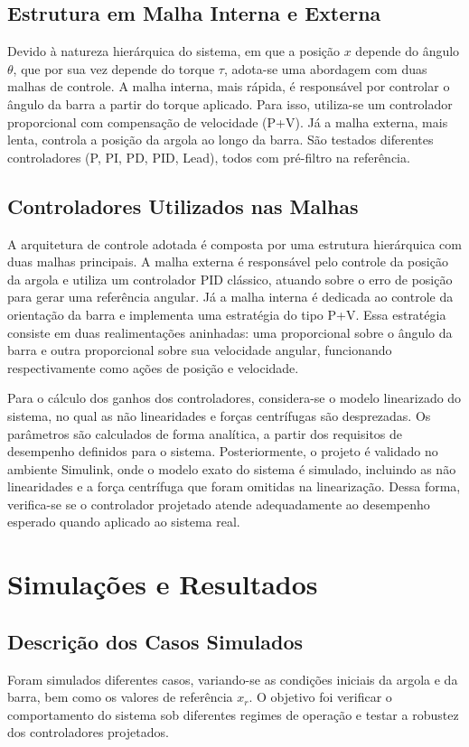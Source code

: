\documentclass[a4paper, 12pt]{article}
\begin{document}
\subsection{Estrutura em Malha Interna e Externa}
Devido à natureza hierárquica do sistema, em que a posição \( x \) depende do ângulo \( \theta \), que por sua vez depende do torque \( \tau \), adota-se uma abordagem com duas malhas de controle. A malha interna, mais rápida, é responsável por controlar o ângulo da barra a partir do torque aplicado. Para isso, utiliza-se um controlador proporcional com compensação de velocidade (P+V). Já a malha externa, mais lenta, controla a posição da argola ao longo da barra. São testados diferentes controladores (P, PI, PD, PID, Lead), todos com pré-filtro na referência.

\subsection{Controladores Utilizados nas Malhas}

A arquitetura de controle adotada é composta por uma estrutura hierárquica com duas malhas principais. A malha externa é responsável pelo controle da posição da argola e utiliza um controlador PID clássico, atuando sobre o erro de posição para gerar uma referência angular. Já a malha interna é dedicada ao controle da orientação da barra e implementa uma estratégia do tipo P+V. Essa estratégia consiste em duas realimentações aninhadas: uma proporcional sobre o ângulo da barra e outra proporcional sobre sua velocidade angular, funcionando respectivamente como ações de posição e velocidade.

Para o cálculo dos ganhos dos controladores, considera-se o modelo linearizado do sistema, no qual as não linearidades e forças centrífugas são desprezadas. Os parâmetros são calculados de forma analítica, a partir dos requisitos de desempenho definidos para o sistema. Posteriormente, o projeto é validado no ambiente Simulink, onde o modelo exato do sistema é simulado, incluindo as não linearidades e a força centrífuga que foram omitidas na linearização. Dessa forma, verifica-se se o controlador projetado atende adequadamente ao desempenho esperado quando aplicado ao sistema real.


\section{Simulações e Resultados}

\subsection{Descrição dos Casos Simulados}
Foram simulados diferentes casos, variando-se as condições iniciais da argola e da barra, bem como os valores de referência \( x_r \). O objetivo foi verificar o comportamento do sistema sob diferentes regimes de operação e testar a robustez dos controladores projetados.
\end{document}
